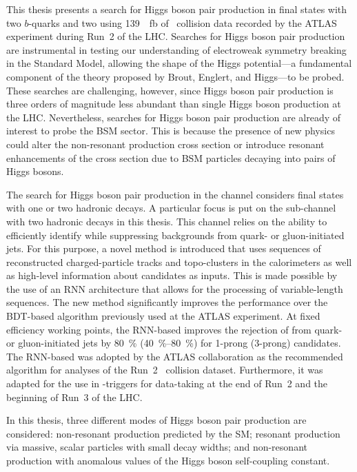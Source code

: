 This thesis presents a search for Higgs boson pair production in final states
with two $b$-quarks and two \tauleptons using \SI{139}{\per\femto\barn} of
\pp~collision data recorded by the ATLAS experiment during Run~2 of the
LHC. Searches for Higgs boson pair production are instrumental in testing our
understanding of electroweak symmetry breaking in the Standard Model, allowing
the shape of the Higgs potential---a fundamental component of the theory
proposed by Brout, Englert, and Higgs---to be probed. These searches are
challenging, however, since Higgs boson pair production is three orders of
magnitude less abundant than single Higgs boson production at the
LHC. Nevertheless, searches for Higgs boson pair production are already of
interest to probe the BSM sector. This is because the presence of new physics
could alter the non-resonant \HH production cross section or introduce resonant
enhancements of the cross section due to BSM particles decaying into pairs of
Higgs bosons.


The search for Higgs boson pair production in the \bbtautau channel considers
final states with one or two hadronic \taulepton decays. A particular focus is
put on the sub-channel with two hadronic \taulepton decays in this thesis. This
channel relies on the ability to efficiently identify \tauhadvis while
suppressing backgrounds from quark- or gluon-initiated jets. For this purpose, a
novel \tauid method is introduced that uses sequences of reconstructed
charged-particle tracks and topo-clusters in the calorimeters as well as
high-level information about \tauhadvis candidates as inputs. This is made
possible by the use of an RNN architecture that allows for the processing of
variable-length sequences. The new method significantly improves the \tauid
performance over the BDT-based algorithm previously used at the ATLAS
experiment. At fixed \tauhadvis efficiency working points, the RNN-based \tauid
improves the rejection of \faketauhadvis from quark- or gluon-initiated jets by
\SI{80}{\percent} (\SIrange{40}{80}{\percent}) for 1-prong (3-prong) \tauhadvis
candidates.
The RNN-based \tauid was adopted by the ATLAS collaboration as the recommended
\tauid algorithm for analyses of the Run~2 \pp~collision dataset. Furthermore,
it was adapted for the use in \tauhadvis-triggers for data-taking at the end of
Run~2 and the beginning of Run~3 of the LHC.


In this thesis, three different modes of Higgs boson pair production are
considered: non-resonant \HH production predicted by the SM; resonant \HH
production via massive, scalar particles with small decay widths; and
non-resonant \HH production with anomalous values of the Higgs boson
self-coupling constant.


